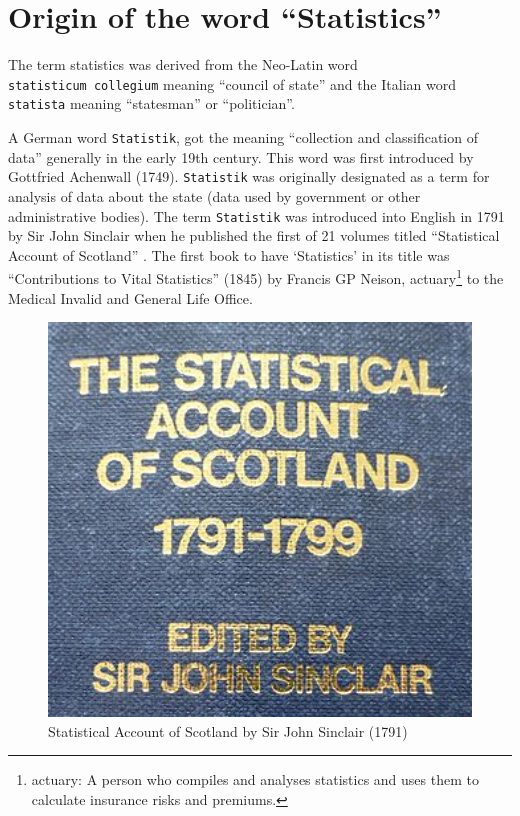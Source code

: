 \documentclass[
]{book}
\begin{document}
\hypertarget{origin-of-the-word-statistics}{%
\section{Origin of the word ``Statistics''}\label{origin-of-the-word-statistics}}

The term statistics was derived from the Neo-Latin word
\texttt{statisticum\ collegium} meaning ``council of state'' and the Italian word
\texttt{statista} meaning ``statesman'' or ``politician''.

A German word \texttt{Statistik}, got the meaning ``collection and
classification of data'' generally in the early 19th century. This word
was first introduced by Gottfried Achenwall (1749). \texttt{Statistik} was
originally designated as a term for analysis of data about the state
(data used by government or other administrative bodies). The term
\texttt{Statistik} was introduced into English in 1791 by Sir John Sinclair
when he published the first of 21 volumes titled ``Statistical Account of
Scotland'' \citep{ball}. The first book to have `Statistics' in its title was
``Contributions to Vital Statistics'' (1845) by Francis GP Neison,
actuary\footnote{actuary: A person who compiles and analyses
  statistics and uses them to calculate insurance risks and premiums.} to the Medical Invalid and General Life Office.

\begin{figure}

{\centering \includegraphics[width=4.44in]{images/history1} 

}

\caption{Statistical Account of Scotland by Sir John Sinclair (1791)}\label{fig:scotland}
\end{figure}
\end{document}
